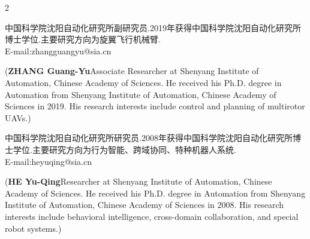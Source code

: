 \documentclass{aas}
\begin{document}
\begin{multicols}{2}
\begin{biography}
\samepage
{}\quad 中国科学院沈阳自动化研究所副研究员.2019年获得中国科学院沈阳自动化研究所博士学位.主要研究方向为旋翼飞行机械臂.\\E-mail:zhangguangyu@sia.cn

\nopagebreak
\noindent({\bf ZHANG Guang-Yu}\quad Associate Researcher at Shenyang Institute of Automation, Chinese Academy of Sciences. He received his Ph.D. degree in Automation from Shenyang Institute of Automation, Chinese Academy of Sciences in 2019. His research interests include control and planning of multirotor UAVs.)
\end{biography}

\begin{biography}
\samepage
{}\quad 中国科学院沈阳自动化研究所研究员.2008年获得中国科学院沈阳自动化研究所博士学位.主要研究方向为行为智能、跨域协同、特种机器人系统.\\E-mail:heyuqing@sia.cn

\nopagebreak
\noindent({\bf HE Yu-Qing}\quad Researcher at Shenyang Institute of Automation, Chinese Academy of Sciences. He received his Ph.D. degree in Automation from Shenyang Institute of Automation, Chinese Academy of Sciences in 2008. His research interests include behavioral intelligence, cross-domain collaboration, and special robot systems.)
\end{biography}

\raggedcolumns
\end{multicols}
\end{document}
